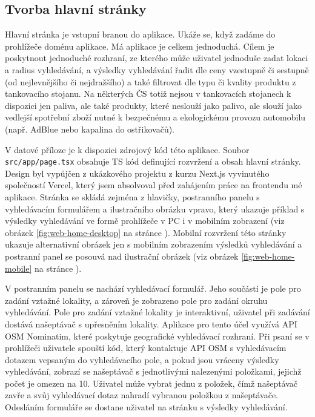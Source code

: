 \subsection{Tvorba hlavní stránky}

Hlavní stránka je vstupní branou do aplikace. Ukáže se, když zadáme
do prohlížeče doménu aplikace. Má aplikace je celkem jednoduchá. Cílem
je poskytnout jednoduché rozhraní, ze kterého může uživatel jednoduše
zadat lokaci a radius vyhledávání, a výsledky vyhledávání řadit dle
ceny vzestupně či sestupně (od nejlevnějšího či nejdražšího) a také filtrovat
dle typu či kvality produktu z tankovacího stojanu. Na některých ČS totiž
nejsou v tankovacích stojanech k dispozici jen paliva, ale také produkty,
které neslouží jako palivo, ale slouží jako vedlejší spotřební zboží nutné
k bezpečnému a ekologickému provozu automobilu (např. AdBlue nebo kapalina
do ostřikovačů).

V datové příloze je k dispozici zdrojový kód této aplikace. Soubor
\texttt{src/app/page.tsx} obsahuje TS kód definující rozvržení a obsah
hlavní stránky. Design byl vypůjčen z ukázkového projektu z kurzu Next.js
vyvinutého společností Vercel, který jsem absolvoval před zahájením práce
na frontendu mé aplikace. Stránka se skládá zejména z hlavičky,
postranního panelu s vyhledávacím formulářem a ilustračního obrázku vpravo,
který ukazuje příklad s výsledky vyhledávání ve formě prohlížeče v PC
i v mobilním zobrazení (viz obrázek \ref{fig:web-home-desktop} na stránce
\pageref{fig:web-home-desktop}). Mobilní rozvržení této stránky ukazuje
alternativní obrázek jen s mobilním zobrazením výsledků vyhledávání a postranní
panel se posouvá nad ilustrační obrázek (viz obrázek \ref{fig:web-home-mobile}
na stránce \pageref{fig:web-home-mobile}).

V postranním panelu se nachází vyhledávací formulář. Jeho součástí je pole
pro zadání vztažné lokality, a zároveň je zobrazeno pole pro zadání okruhu
vyhledávání. Pole pro zadání vztažné lokality je interaktivní, uživatel při
zadávání dostává našeptávač s upřesněním lokality. Aplikace pro tento účel
využívá API OSM Nominatim, které poskytuje geografické vyhledávací rozhraní.
Při psaní se v prohlížeči uživatele spouští kód, který kontaktuje API OSM
s vyhledávacím dotazem vepsaným do vyhledávacího pole, a pokud jsou vráceny
výsledky vyhledávání, zobrazí se našeptávač s jednotlivými nalezenými
položkami, jejichž počet je omezen na 10. Uživatel může vybrat jednu
z položek, čímž našeptávač zavře a svůj vyhledávací dotaz nahradí vybranou
položkou z našeptávače. Odesláním formuláře se dostane uživatel na stránku
s výsledky vyhledávání.

